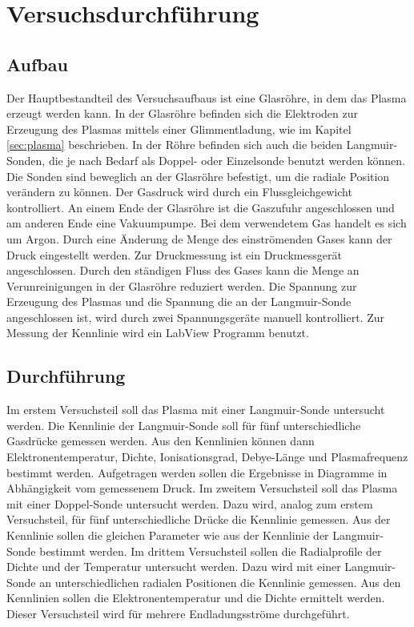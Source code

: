 \section{Versuchsdurchführung}
\subsection{Aufbau}
Der Hauptbestandteil des Versuchsaufbaus ist eine Glasröhre, in dem das Plasma erzeugt werden kann. In der Glasröhre befinden sich die Elektroden zur Erzeugung des Plasmas mittels einer Glimmentladung, wie im Kapitel \ref{sec:plasma} beschrieben. In der Röhre befinden sich auch die beiden Langmuir-Sonden, die je nach Bedarf als Doppel- oder Einzelsonde benutzt werden können. Die Sonden sind beweglich an der Glasröhre befestigt, um die radiale Position verändern zu können. Der Gasdruck wird durch ein Flussgleichgewicht kontrolliert. An einem Ende der Glasröhre ist die Gaszufuhr angeschlossen und am anderen Ende eine Vakuumpumpe. Bei dem verwendetem Gas handelt es sich um Argon. Durch eine Änderung de Menge des einströmenden Gases kann der Druck eingestellt werden. Zur Druckmessung ist ein Druckmessgerät angeschlossen. Durch den ständigen Fluss des Gases kann die Menge an Verunreinigungen in der Glasröhre reduziert werden. Die Spannung zur Erzeugung des Plasmas und die Spannung die an der Langmuir-Sonde angeschlossen ist, wird durch zwei Spannungsgeräte manuell kontrolliert. Zur Messung der Kennlinie wird ein LabView Programm benutzt. 
\subsection{Durchführung}
Im erstem Versuchsteil soll das Plasma mit einer Langmuir-Sonde untersucht werden. Die Kennlinie der Langmuir-Sonde soll für fünf unterschiedliche Gasdrücke gemessen  werden. Aus den Kennlinien k\"onnen dann Elektronentemperatur, Dichte, Ionisationsgrad, Debye-Länge und Plasmafrequenz bestimmt werden. Aufgetragen werden sollen die Ergebnisse in Diagramme in Abhängigkeit vom gemessenem Druck.
Im zweitem Versuchsteil soll das Plasma mit einer Doppel-Sonde untersucht werden. Dazu wird, analog zum erstem Versuchsteil, für fünf unterschiedliche Drücke die Kennlinie gemessen. Aus der Kennlinie sollen die gleichen Parameter wie aus der Kennlinie der Langmuir-Sonde bestimmt werden. Im drittem Versuchsteil sollen die Radialprofile der Dichte und der Temperatur untersucht werden. Dazu wird mit einer Langmuir-Sonde an unterschiedlichen radialen Positionen die Kennlinie gemessen. Aus den Kennlinien sollen die Elektronentemperatur und die Dichte ermittelt werden. Dieser Versuchsteil wird für mehrere Endladungsströme durchgeführt.